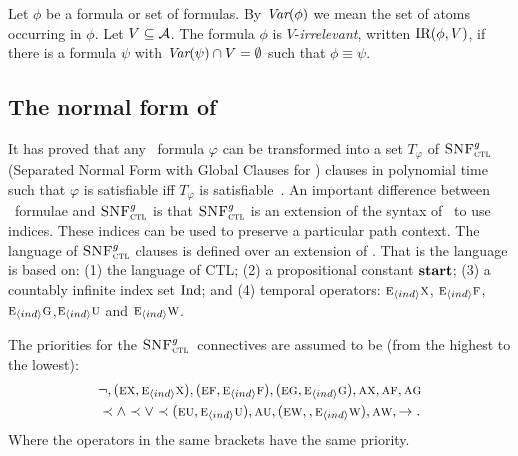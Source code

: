 \documentclass[letterpaper]{article} %
\begin{document}
Let $\phi$ be a formula or set of formulas. By $\textit{Var}(\phi)$ we mean the set of atoms occurring in $\phi$.
Let $V\subseteq\cal A$.
The formula $\phi$ is $V$-{\em irrelevant}, written $\textrm{IR}(\phi,V)$,
if there is a formula $\psi$ with
$\textit{Var}(\psi)\cap V=\emptyset$ such that $\phi\equiv\psi$.


\subsection{The normal form of \CTL}
It has proved that any \CTL\ formula $\varphi$ can be transformed into a set $T_\varphi$ of ${\textsc{SNF}_{\textsc{ctl}}^g}$ (Separated Normal Form with Global Clauses for \CTL) clauses in polynomial time such that $\varphi$ is satisfiable iff $T_\varphi$ is satisfiable~\cite{zhang2008first}.
An important difference between \CTL\ formulae and ${\textsc{SNF}_{\textsc{ctl}}^g}$ is that ${\textsc{SNF}_{\textsc{ctl}}^g}$ is an extension of the syntax of \CTL\ to use indices. These indices can be used to preserve a particular path context. The language of ${\textsc{SNF}_{\textsc{ctl}}^g}$ clauses is defined over an extension of \CTL. That is the language is based on: (1) the language of CTL; (2) a propositional constant $\textbf{start}$; (3) a countably infinite index set $\textrm{Ind}$; and (4) temporal operators: $\textsc{e}_{{\langle{ind}\rangle}} \textsc{x}$, $\textsc{e}_{{\langle{ind}\rangle}} \textsc{f}$, $\textsc{e}_{{\langle{ind}\rangle}} \textsc{g}$,$\textsc{e}_{{\langle{ind}\rangle}} \textsc{u}$ and $\textsc{e}_{{\langle{ind}\rangle}} \textsc{w}$.

The priorities for the ${\textsc{SNF}_{\textsc{ctl}}^g}$\ connectives are assumed to be (from the highest to the lowest):
\begin{align*}
  &\neg, (\textsc{e}\textsc{x},\textsc{e}_{{\langle{ind}\rangle}}\textsc{x}), (\textsc{e}\textsc{f} ,\textsc{e}_{{\langle{ind}\rangle}}\textsc{f}), (\textsc{e}\textsc{g},\textsc{e}_{{\langle{ind}\rangle}} \textsc{g}), \textsc{a}\textsc{x}, \textsc{a}\textsc{f}, \textsc{a}\textsc{g} \\
  &\prec \land \prec \lor \prec (\textsc{e}\textsc{u},\textsc{e}_{{\langle{ind}\rangle}} \textsc{u}), \textsc{a}\textsc{u}, (\textsc{e} \textsc{w}, ,\textsc{e}_{{\langle{ind}\rangle}}\textsc{w}), \textsc{a} \textsc{w}, \rightarrow.
\end{align*}
Where the operators in the same brackets have the same priority.
\end{document}
